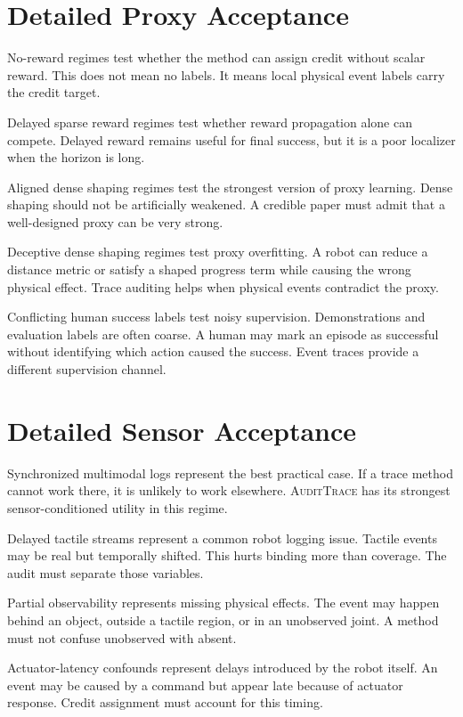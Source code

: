 \documentclass{article}
\newcommand{\method}{\textsc{AuditTrace}\xspace}
\begin{document}
\section{Detailed Proxy Acceptance}

No-reward regimes test whether the method can assign credit without scalar reward. This does not mean no labels. It means local physical event labels carry the credit target.

Delayed sparse reward regimes test whether reward propagation alone can compete. Delayed reward remains useful for final success, but it is a poor localizer when the horizon is long.

Aligned dense shaping regimes test the strongest version of proxy learning. Dense shaping should not be artificially weakened. A credible paper must admit that a well-designed proxy can be very strong.

Deceptive dense shaping regimes test proxy overfitting. A robot can reduce a distance metric or satisfy a shaped progress term while causing the wrong physical effect. Trace auditing helps when physical events contradict the proxy.

Conflicting human success labels test noisy supervision. Demonstrations and evaluation labels are often coarse. A human may mark an episode as successful without identifying which action caused the success. Event traces provide a different supervision channel.

\section{Detailed Sensor Acceptance}

Synchronized multimodal logs represent the best practical case. If a trace method cannot work there, it is unlikely to work elsewhere. \method has its strongest sensor-conditioned utility in this regime.

Delayed tactile streams represent a common robot logging issue. Tactile events may be real but temporally shifted. This hurts binding more than coverage. The audit must separate those variables.

Partial observability represents missing physical effects. The event may happen behind an object, outside a tactile region, or in an unobserved joint. A method must not confuse unobserved with absent.

Actuator-latency confounds represent delays introduced by the robot itself. An event may be caused by a command but appear late because of actuator response. Credit assignment must account for this timing.
\end{document}
